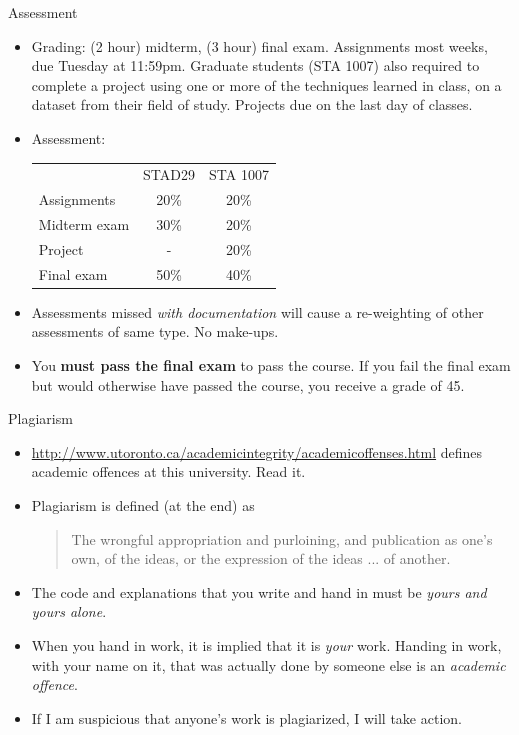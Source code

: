\documentclass[unknownkeysallowed]{beamer}\usepackage[]{graphicx}\usepackage[]{color}
\begin{document}
\begin{frame}{Assessment}
\begin{itemize}
\item Grading: (2 hour) midterm, (3 hour) final exam. Assignments most
  weeks, due Tuesday at 11:59pm. 
  Graduate students (STA 1007) also required to
  complete a project using one or more of the techniques learned in
  class, on a dataset from their field of study.    Projects due on
  the last day of classes.

\item Assessment:

  \begin{tabular}{lcc}
    & STAD29 & STA 1007\\
    Assignments & 20\% & 20\%\\
    Midterm exam & 30\%  & 20\% \\
    Project & - & 20\%\\
    Final exam & 50\% & 40\%
  \end{tabular}

\item Assessments missed \emph{with documentation} will cause a
  re-weighting of other assessments of same type. No make-ups.
\item You \textbf{must pass the final exam} to pass the course. If you
  fail the final exam but would otherwise have passed the course, you
  receive a grade of 45.

\end{itemize}
\end{frame}

\begin{frame}{Plagiarism}

  \begin{itemize}
  \item
    \url{http://www.utoronto.ca/academicintegrity/academicoffenses.html}
    defines academic offences at this university. Read it.
  \item Plagiarism is defined (at the end) as
    \begin{quote}
       The wrongful appropriation and purloining, and publication as one’s own, of the ideas, or the expression of the ideas ... of another.
    \end{quote}
    \item The code and
    explanations  that
    you write and hand in must be \emph{yours and yours
      alone}. 
    \item When you hand in work, it is implied that it is
    \emph{your} work. Handing in work, with your name on it, that was actually done by
    someone else is an \emph{academic offence}.
  \item If I am suspicious
    that anyone's work is plagiarized, I will take action.
    
  \end{itemize}
  
\end{frame}
\end{document}
